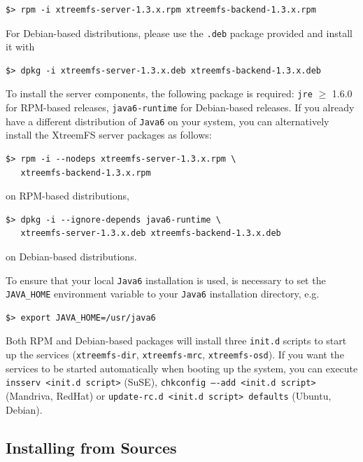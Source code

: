 \documentclass[a4paper,10pt]{book}
\begin{document}
\begin{verbatim}
$> rpm -i xtreemfs-server-1.3.x.rpm xtreemfs-backend-1.3.x.rpm
\end{verbatim}


For Debian-based distributions, please use the \texttt{.deb} package provided and install it with

\begin{verbatim}
$> dpkg -i xtreemfs-server-1.3.x.deb xtreemfs-backend-1.3.x.deb
\end{verbatim}


To install the server components, the following package is required: \texttt{jre} $\geq$ 1.6.0 for RPM-based releases, \texttt{java6-runtime} for Debian-based releases. If you already have a different distribution of \texttt{Java6} on your system, you can alternatively install the XtreemFS server packages as follows:

\begin{verbatim}
$> rpm -i --nodeps xtreemfs-server-1.3.x.rpm \
   xtreemfs-backend-1.3.x.rpm
\end{verbatim}

on RPM-based distributions,

\begin{verbatim}
$> dpkg -i --ignore-depends java6-runtime \
   xtreemfs-server-1.3.x.deb xtreemfs-backend-1.3.x.deb
\end{verbatim}

on Debian-based distributions.

To ensure that your local \texttt{Java6} installation is used, is necessary to set the \texttt{JAVA\_HOME} environment variable to your \texttt{Java6} installation directory, e.g.\

\begin{verbatim}
$> export JAVA_HOME=/usr/java6
\end{verbatim}


Both RPM and Debian-based packages will install three \texttt{init.d} scripts to start up the services (\texttt{xtreemfs-dir}, \texttt{xtreemfs-mrc}, \texttt{xtreemfs-osd}). If you want the services to be started automatically when booting up the system, you can execute \texttt{insserv <init.d script>} (SuSE), \texttt{chkconfig ----add <init.d script>} (Mandriva, RedHat) or \texttt{update-rc.d <init.d script> defaults} (Ubuntu, Debian).

\subsection{Installing from Sources}
\end{document}
